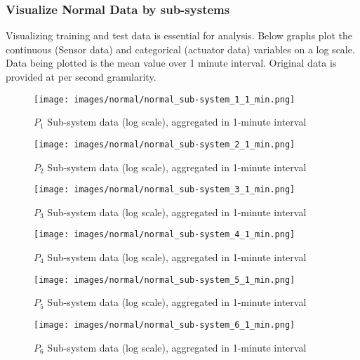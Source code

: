 \documentclass{article}
\begin{document}
\subsubsection{Visualize Normal Data by sub-systems}
Visualizing training and test data is essential for analysis. Below graphs plot the continuous (Sensor data) and categorical (actuator data) variables on a log scale. Data being plotted is the mean value over 1 minute interval. Original data is provided at per second granularity.
    \begin{figure}[!ht]
        \texttt{[image: images/normal/normal\_sub-system\_1\_1\_min.png]}
        \caption{$P_1$ Sub-system data (log scale), aggregated in 1-minute interval}
        \label{fig:normal-P1}            

        \texttt{[image: images/normal/normal\_sub-system\_2\_1\_min.png]}
        \caption{$P_2$ Sub-system data (log scale), aggregated in 1-minute interval}
        \label{fig:normal-P2}

        \texttt{[image: images/normal/normal\_sub-system\_3\_1\_min.png]}
        \caption{$P_3$ Sub-system data (log scale), aggregated in 1-minute interval}
        \label{fig:normal-P3}
    \end{figure}
    \clearpage
    \begin{figure}[!ht]

        \texttt{[image: images/normal/normal\_sub-system\_4\_1\_min.png]}
        \caption{$P_4$ Sub-system data (log scale), aggregated in 1-minute interval}
        \label{fig:normal-P4}            
        
        \texttt{[image: images/normal/normal\_sub-system\_5\_1\_min.png]}
        \caption{$P_5$ Sub-system data (log scale), aggregated in 1-minute interval}
        \label{fig:normal-P5}

        \texttt{[image: images/normal/normal\_sub-system\_6\_1\_min.png]}
        \caption{$P_6$ Sub-system data (log scale), aggregated in 1-minute interval}
        \label{fig:normal-P6}

    \end{figure}

\clearpage
\end{document}
